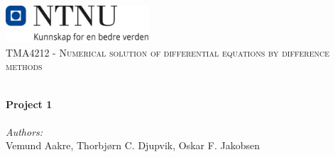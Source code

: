 
\begin{titlepage}
\vbox{ }
\vbox{ }
\begin{center}
\includegraphics[width=0.40\textwidth]{Images/NTNU_logo.png}\\[1cm]
\textsc{\Large TMA4212 - Numerical solution of differential equations by difference methods}\\[0.5cm]
\vbox{ }

\HRule \\[0.4cm]
{ \huge \bfseries Project 1}\\[0.4cm]
\HRule \\[1.5cm]

\large
\emph{Authors:}\\
Vemund Aakre, Thorbjørn C. Djupvik, Oskar F. Jakobsen
\vfill

\end{center}
\end{titlepage}
